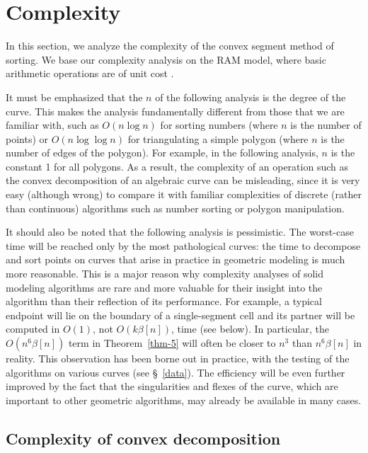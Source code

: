 \section{Complexity}
\label{s-c}

In this section, we analyze the complexity of the convex segment method of sorting.
We base our complexity analysis on the RAM model, where basic arithmetic operations
are of unit cost \cite{ahu}.

It must be emphasized that the $n$ of the following analysis is the degree of the curve.
This makes the analysis fundamentally different from those that we
are familiar with, such as $O(n \log n)$ for sorting numbers (where
$n$ is the number of points) or $O(n \log \log n)$ for triangulating a simple
polygon (where $n$ is the number of edges of the polygon).
For example, in the following analysis, $n$ is the constant 1 for all polygons.
As a result, the complexity of an operation such as the convex decomposition of an
algebraic curve can be misleading, since it is very easy (although wrong) to 
compare it with familiar complexities of discrete (rather than continuous) algorithms 
such as number sorting or polygon manipulation.

It should also be noted that the following analysis is pessimistic.
The worst-case time will be reached only by the most pathological curves: the time to 
decompose and sort points on curves that arise in practice 
in geometric modeling is much more reasonable.
This is a major reason why complexity analyses of solid modeling algorithms are rare
and more valuable for their insight into the algorithm than their reflection of its
performance.
For example, a typical endpoint will lie on the boundary of a single-segment cell and its 
partner will be computed in $O(1)$, not $O(k \beta[n])$, time (see below).
In particular, the $O(n^{6}\beta[n])$ term in Theorem~\ref{thm-5} will often be
closer to $n^{3}$ than $n^{6}\beta[n]$ in reality.
This observation has been borne out in practice, with the testing of the algorithms on
various curves (see \S~\ref{data}).
The efficiency will be even further improved by the fact that the singularities and 
flexes of the curve, which are important to other geometric algorithms, may already 
be available in many cases.

\subsection{Complexity of convex decomposition}

